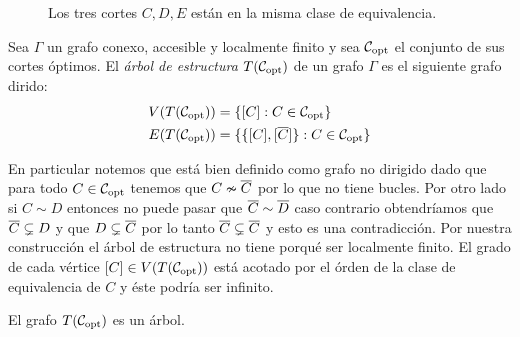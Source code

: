 \documentclass[tesis.tex]{subfiles}
\begin{document}
\begin{ej}
\begin{figure}[H]
		\caption{Los tres cortes $C,D,E$ están en la misma clase de equivalencia.}
	\end{figure}
\end{ej}

\begin{deff}
	Sea $\Gamma$ un grafo conexo, accesible y localmente finito y sea ${\cal C}_{\text{opt}}$ el conjunto de sus cortes óptimos.
	El \emph{árbol de estructura} $T({\cal C}_{\text{opt}})$ de un grafo $\Gamma$ es el siguiente grafo dirido:
	\begin{align*}
		V(T({\cal C}_{\text{opt}})) &= \{ [C] : C \in {\cal C}_{\text{opt}} \} \\
		E(T({\cal C}_{\text{opt}})) &= \{ \{ [C], [\overline C] \} : C \in {\cal C}_{\text{opt}}   \}
	\end{align*}
\end{deff}

En particular notemos que está bien definido como grafo no dirigido dado que para todo $C \in {\cal C}_{\text{opt}}$ tenemos que $C \nsim \overline C$ por lo que no tiene bucles.
Por otro lado si $C \sim D$ entonces no puede pasar que $\overline C \sim \overline D$ caso contrario obtendríamos que $\overline C \subsetneq D$ y que $D \subsetneq \overline C$ por lo tanto $\overline C \subsetneq \overline C$ y esto es una contradicción.
Por nuestra construcción el árbol de estructura no tiene porqué ser localmente finito.
El grado de cada vértice $[C] \in V(T({\cal C}_{\text{opt}}))$ está acotado por el órden de la clase de equivalencia de $C$ y éste podría ser infinito.

\begin{prop}
	El grafo $T({\cal C}_{\text{opt}})$ es un árbol.
\end{prop}
\end{document}
